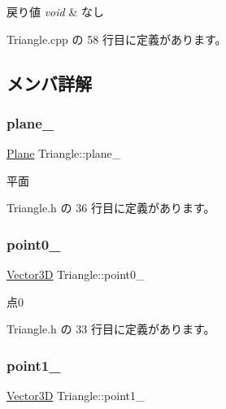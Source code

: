 \begin{DoxyRetVals}{戻り値}
{\em void} & なし \\
\hline
\end{DoxyRetVals}


 Triangle.\+cpp の 58 行目に定義があります。



\subsection{メンバ詳解}
\mbox{\label{class_triangle_a93586199c2c173771f2e167f477eaa70}} 
\subsubsection{\texorpdfstring{plane\+\_\+}{plane\_}}
{\footnotesize\ttfamily \mbox{\hyperlink{class_plane}{Plane}} Triangle\+::plane\+\_\+\hspace{0.3cm}{\ttfamily [private]}}



平面 



 Triangle.\+h の 36 行目に定義があります。

\mbox{\label{class_triangle_a307e9043e9755e06387458cd84993662}} 
\subsubsection{\texorpdfstring{point0\+\_\+}{point0\_}}
{\footnotesize\ttfamily \mbox{\hyperlink{class_vector3_d}{Vector3D}} Triangle\+::point0\+\_\+\hspace{0.3cm}{\ttfamily [private]}}



点0 



 Triangle.\+h の 33 行目に定義があります。

\mbox{\label{class_triangle_aa846eb6b25478f0227225c74c53bb5c1}} 
\subsubsection{\texorpdfstring{point1\+\_\+}{point1\_}}
{\footnotesize\ttfamily \mbox{\hyperlink{class_vector3_d}{Vector3D}} Triangle\+::point1\+\_\+\hspace{0.3cm}{\ttfamily [private]}}



